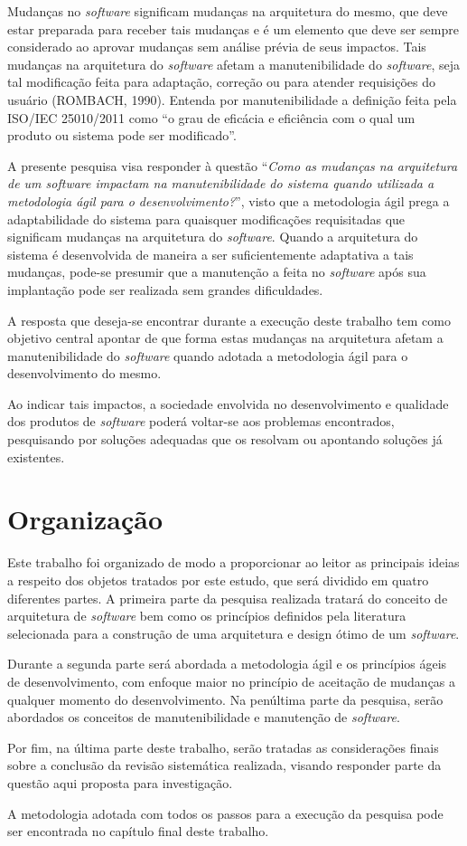Mudanças no \textit{software} significam mudanças na arquitetura do mesmo, que deve estar preparada para receber tais mudanças e é um elemento que deve ser sempre considerado ao aprovar mudanças sem análise prévia de seus impactos. Tais mudanças na arquitetura do \textit{software} afetam a manutenibilidade do \textit{software},  seja tal modificação feita para adaptação, correção ou para atender requisições do usuário (ROMBACH, 1990). Entenda por manutenibilidade a definição feita pela ISO/IEC 25010/2011 como  “o grau de eficácia e eficiência com o qual um produto ou sistema pode ser modificado”.

A presente pesquisa visa responder à questão “\textit{Como as mudanças na arquitetura de um software impactam na manutenibilidade do sistema quando utilizada a metodologia ágil para o desenvolvimento?}”, visto que a metodologia ágil prega a adaptabilidade do sistema para quaisquer modificações requisitadas que significam mudanças na arquitetura do \textit{software}. Quando a arquitetura do sistema é desenvolvida de maneira a ser suficientemente adaptativa a tais mudanças, pode-se presumir que a manutenção a feita no \textit{software} após sua implantação pode ser realizada sem grandes dificuldades.

A resposta que deseja-se encontrar durante a execução deste trabalho tem como objetivo central apontar de que forma estas mudanças na arquitetura afetam a manutenibilidade do \textit{software} quando adotada a metodologia ágil para o desenvolvimento do mesmo.

Ao indicar tais impactos, a sociedade envolvida no desenvolvimento e qualidade dos produtos de \textit{software} poderá voltar-se aos problemas encontrados, pesquisando por soluções adequadas que os resolvam ou apontando soluções já existentes.

\section{Organização}
Este trabalho foi organizado de modo a proporcionar ao leitor as principais ideias a respeito dos objetos tratados por este estudo, que será dividido em quatro diferentes partes. A primeira parte da pesquisa realizada tratará do conceito de arquitetura de \textit{software} bem como os princípios definidos pela literatura selecionada para a construção de uma arquitetura e design ótimo de um \textit{software}.

Durante a segunda parte será abordada a metodologia ágil e os princípios ágeis de desenvolvimento, com enfoque maior no princípio de aceitação de mudanças a qualquer momento do desenvolvimento.
Na penúltima parte da pesquisa, serão abordados os conceitos de manutenibilidade e manutenção de \textit{software}. 

Por fim, na última parte deste trabalho, serão tratadas as considerações finais sobre a conclusão da revisão sistemática realizada, visando responder parte da questão aqui proposta para investigação.

A metodologia adotada com todos os passos para a execução da pesquisa pode ser encontrada no capítulo final deste trabalho.
